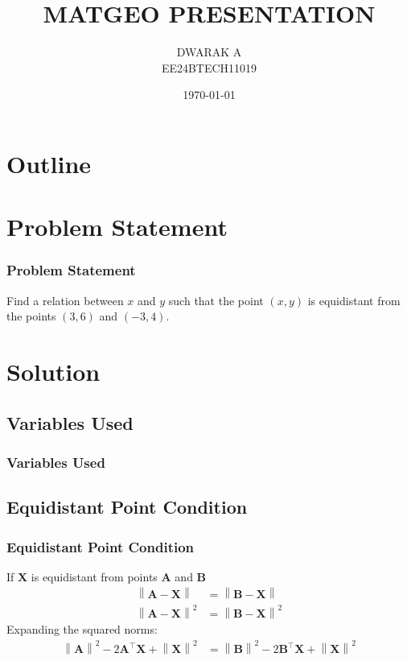 \documentclass{beamer}
\title{MATGEO PRESENTATION}
\author{DWARAK A\\EE24BTECH11019}
\date{\today}
\theoremstyle{remark}
\providecommand{\norm}[1]{\left\lVert#1\right\rVert}
\let\vec\mathbf
\numberwithin{equation}{section}
\begin{document}
\begin{frame}
\titlepage
\end{frame}

\section*{Outline}
\begin{frame}
\tableofcontents
\end{frame}

\section{Problem Statement}
\begin{frame}
\frametitle{Problem Statement}
Find a relation between $x$ and $y$ such that the point $(x, y)$ is equidistant from the points $(3, 6)$ and $(-3, 4)$.
\end{frame}

\section{Solution}
\subsection{Variables Used}
\begin{frame}
    \frametitle{Variables Used}
    \begin{table}[H]    
  \centering
  
\end{table}
\end{frame}

\subsection{Equidistant Point Condition}
\begin{frame}
\frametitle{Equidistant Point Condition}

If $\vec{X}$ is equidistant from points $\vec{A}$ and $\vec{B}$
\begin{align}
	\norm{\vec{A} - \vec{X}} &= \norm{\vec{B} - \vec{X}} \\
	\norm{\vec{A} - \vec{X}}^2 &= \norm{\vec{B} - \vec{X}}^2
\end{align}
Expanding the squared norms:
\begin{align}
    \label{eq:mat_eqn_unspl}
	\norm{\vec{A}}^2 - 2\vec{A}^\top \vec{X} + \norm{\vec{X}}^2 &= \norm{\vec{B}}^2 - 2\vec{B}^\top \vec{X} + \norm{\vec{X}}^2
\end{align}
\end{frame}
\end{document}
